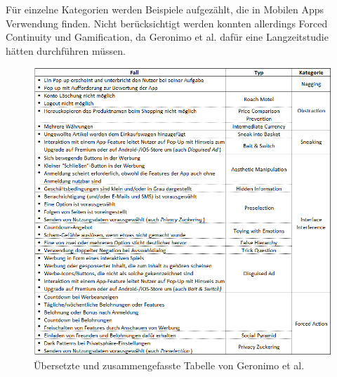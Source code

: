 \documentclass[a4paper]{article}
\begin{document}
Für einzelne Kategorien werden Beispiele aufgezählt, die in Mobilen Apps Verwendung finden. Nicht berücksichtigt werden konnten allerdings Forced Continuity und Gamification, da Geronimo et al. dafür eine Langzeitstudie hätten durchführen müssen.\newline

\begin{figure}
	\hspace*{-2cm}
	\caption{Übersetzte und zusammengefasste Tabelle von Geronimo et al. \cite{geronimo}}
	\hspace*{-3cm}
	\includegraphics[scale=2.7]{dark_patterns_mobile_ui2}
\end{figure}
\end{document}
